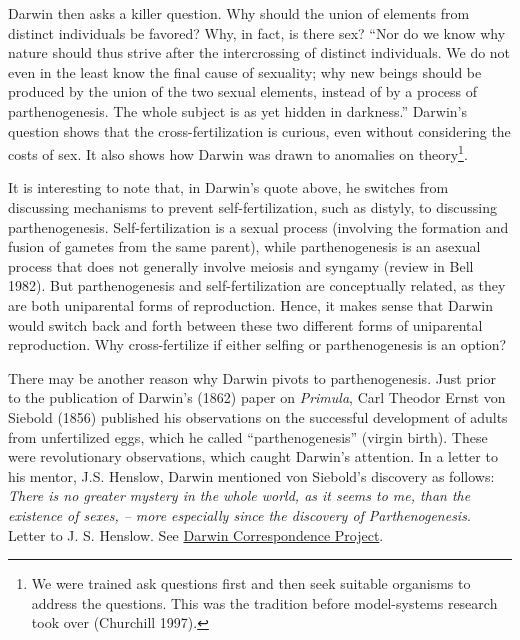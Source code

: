 \documentclass[
  letterpaper,
]{book}
\begin{document}
Darwin then asks a killer question. Why should the union of elements
from distinct individuals be favored? Why, in fact, is there sex? ``Nor
do we know why nature should thus strive after the intercrossing of
distinct individuals. We do not even in the least know the final cause
of sexuality; why new beings should be produced by the union of the two
sexual elements, instead of by a process of parthenogenesis. The whole
subject is as yet hidden in darkness.'' Darwin's question shows that the
cross-fertilization is curious, even without considering the costs of
sex. It also shows how Darwin was drawn to anomalies on
theory\footnote{We were trained ask questions first and then seek
  suitable organisms to address the questions. This was the tradition
  before model-systems research took over (Churchill 1997).}.

It is interesting to note that, in Darwin's quote above, he switches
from discussing mechanisms to prevent self-fertilization, such as
distyly, to discussing parthenogenesis. Self-fertilization is a sexual
process (involving the formation and fusion of gametes from the same
parent), while parthenogenesis is an asexual process that does not
generally involve meiosis and syngamy (review in Bell 1982). But
parthenogenesis and self-fertilization are conceptually related, as they
are both uniparental forms of reproduction. Hence, it makes sense that
Darwin would switch back and forth between these two different forms of
uniparental reproduction. Why cross-fertilize if either selfing or
parthenogenesis is an option?

There may be another reason why Darwin pivots to parthenogenesis. Just
prior to the publication of Darwin's (1862) paper on \emph{Primula},
Carl Theodor Ernst von Siebold (1856) published his observations on the
successful development of adults from unfertilized eggs, which he called
``parthenogenesis'' (virgin birth). These were revolutionary
observations, which caught Darwin's attention. In a letter to his
mentor, J.S. Henslow, Darwin mentioned von Siebold's discovery as
follows: \emph{There is no greater mystery in the whole world, as it
seems to me, than the existence of sexes, -- more especially since the
discovery of Parthenogenesis}. Letter to J. S. Henslow. See
\href{https://www.darwinproject.ac.uk/letter/DCP-LETT-2869.xml}{Darwin
Correspondence Project}.
\end{document}
